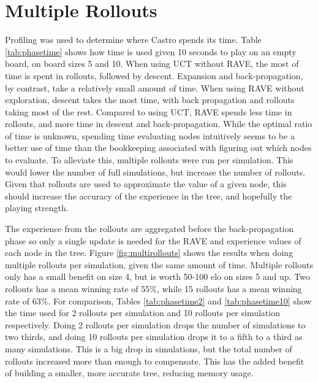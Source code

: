 \section{Multiple Rollouts}

Profiling was used to determine where Castro spends its time. Table \ref{tab:phasetime} shows how time is used given 10 seconds to play on an empty board, on board sizes 5 and 10. When using UCT without RAVE, the most of time is spent in rollouts, followed by descent. Expansion and back-propagation, by contrast, take a relatively small amount of time. When using RAVE without exploration, descent takes the most time, with back propagation and rollouts taking most of the rest. Compared to using UCT, RAVE spends less time in rollouts, and more time in descent and back-propagation. While the optimal ratio of time is unknown, spending time evaluating nodes intuitively seems to be a better use of time than the bookkeeping associated with figuring out which nodes to evaluate. To alleviate this, multiple rollouts were run per simulation. This would lower the number of full simulations, but increase the number of rollouts. Given that rollouts are used to approximate the value of a given node, this should increase the accuracy of the experience in the tree, and hopefully the playing strength.


The experience from the rollouts are aggregated before the back-propagation phase so only a single update is needed for the RAVE and experience values of each node in the tree. Figure \ref{fig:multirollouts} shows the results when doing multiple rollouts per simulation, given the same amount of time. Multiple rollouts only has a small benefit on size 4, but is worth 50-100 elo on sizes 5 and up. Two rollouts has a mean winning rate of 55\%, while 15 rollouts has a mean winning rate of 63\%. For comparison, Tables \ref{tab:phasetime2} and \ref{tab:phasetime10} show the time used for 2 rollouts per simulation and 10 rollouts per simulation respectively. Doing 2 rollouts per simulation drops the number of simulations to two thirds, and doing 10 rollouts per simulation drops it to a fifth to a third as many simulations. This is a big drop in simulations, but the total number of rollouts increased more than enough to compensate. This has the added benefit of building a smaller, more accurate tree, reducing memory usage.

